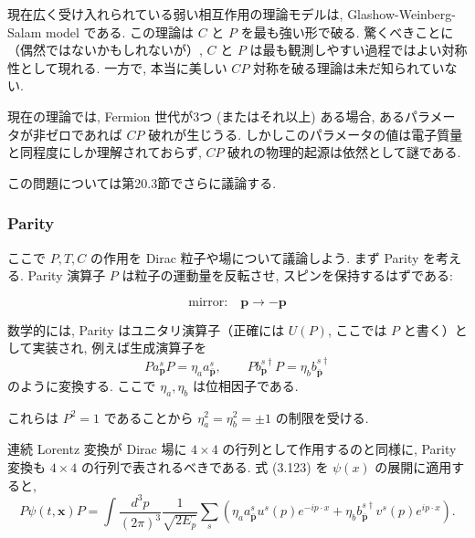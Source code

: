 \documentclass[a4paper,12pt]{article}
\begin{document}
現在広く受け入れられている弱い相互作用の理論モデルは, Glashow-Weinberg-Salam model である.  
この理論は $C$ と $P$ を最も強い形で破る.  
驚くべきことに（偶然ではないかもしれないが）, $C$ と $P$ は最も観測しやすい過程ではよい対称性として現れる.  
一方で, 本当に美しい $CP$ 対称を破る理論は未だ知られていない.  

現在の理論では, Fermion 世代が3つ (またはそれ以上) ある場合, あるパラメータが非ゼロであれば $CP$ 破れが生じうる.  
しかしこのパラメータの値は電子質量と同程度にしか理解されておらず, $CP$ 破れの物理的起源は依然として謎である.  

この問題については第20.3節でさらに議論する.

\subsubsection*{Parity}

ここで $P,T,C$ の作用を Dirac 粒子や場について議論しよう.  
まず Parity を考える. Parity 演算子 $P$ は粒子の運動量を反転させ, スピンを保持するはずである:

\[
\text{mirror:} \quad \mathbf{p} \to -\mathbf{p}
\]

数学的には, Parity はユニタリ演算子（正確には $U(P)$, ここでは $P$ と書く）として実装され,  
例えば生成演算子を
\begin{equation}
P a^s_{\mathbf{p}} P = \eta_a a^s_{\bar{\mathbf{p}}}, 
\qquad 
P b^{s\dagger}_{\mathbf{p}} P = \eta_b b^{s\dagger}_{\bar{\mathbf{p}}}
\tag{3.123}
\end{equation}
のように変換する. ここで $\eta_a,\eta_b$ は位相因子である.  

これらは $P^2=1$ であることから $\eta_a^2=\eta_b^2=\pm1$ の制限を受ける.  

連続 Lorentz 変換が Dirac 場に $4\times4$ の行列として作用するのと同様に,  
Parity 変換も $4\times4$ の行列で表されるべきである.  
式 (3.123) を $\psi(x)$ の展開に適用すると,
\begin{equation}
P\psi(t,\mathbf{x})P = \int \frac{d^3p}{(2\pi)^3}\frac{1}{\sqrt{2E_p}}
\sum_s \left( \eta_a a^s_{\bar{\mathbf{p}}} u^s(p) e^{-ip\cdot x}
+ \eta_b b^{s\dagger}_{\bar{\mathbf{p}}} v^s(p) e^{ip\cdot x} \right).
\tag{3.124}
\end{equation}
\end{document}
